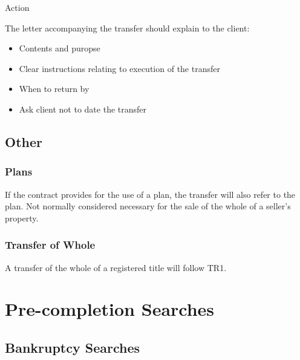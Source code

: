 \documentclass[
]{article}
\providecommand{\tightlist}{%
  \setlength{\itemsep}{0pt}\setlength{\parskip}{0pt}}
\newenvironment{env-8539d7c0-f759-44df-baf4-9844eccd09fd}
{
    \savenotes\tcolorbox[blanker,breakable,left=5pt,borderline west={2pt}{-4pt}{aquamarine}]
}
{
    \endtcolorbox\spewnotes
}
\begin{document}
\begin{env-8539d7c0-f759-44df-baf4-9844eccd09fd}

Action

The letter accompanying the transfer should explain to the client:

\begin{itemize}
\tightlist
\item
  Contents and puropse
\item
  Clear instructions relating to execution of the transfer
\item
  When to return by
\item
  Ask client not to date the transfer
\end{itemize}

\end{env-8539d7c0-f759-44df-baf4-9844eccd09fd}

\hypertarget{other}{%
\subsection{Other}\label{other}}

\hypertarget{plans}{%
\subsubsection{Plans}\label{plans}}

If the contract provides for the use of a plan, the transfer will also
refer to the plan. Not normally considered necessary for the sale of the
whole of a seller's property.

\hypertarget{transfer-of-whole}{%
\subsubsection{Transfer of Whole}\label{transfer-of-whole}}

A transfer of the whole of a registered title will follow TR1.

\hypertarget{pre-completion-searches}{%
\section{Pre-completion Searches}\label{pre-completion-searches}}

\hypertarget{bankruptcy-searches}{%
\subsection{Bankruptcy Searches}\label{bankruptcy-searches}}
\end{document}
